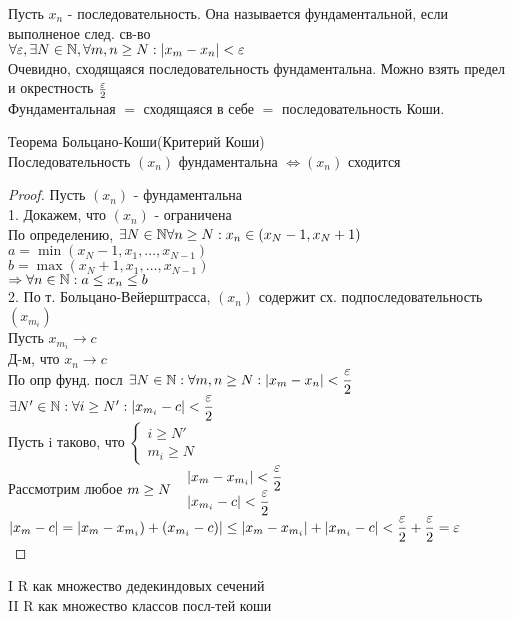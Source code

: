 \begin{definition}
	Пусть $x_n$ - последовательность. Она называется фундаментальной, если выполненое след. св-во \\
	$ \forall \varepsilon,  \exists N \in \mathbb{N}, \forall m,n \geq N : | x_m - x_n | < \varepsilon $\\
	Очевидно, сходящаяся последовательность фундаментальна. Можно взять предел и окрестность $ \frac{\varepsilon}{2} $ \\
	Фундаментальная $=$ сходящаяся в себе $=$ последовательность Коши.
\end{definition}
\begin{theorem}
	Теорема Больцано-Коши(Критерий Коши) \\
	Последовательность $(x_n)$ фундаментальна $ \Leftrightarrow (x_n) $ сходится
	\begin{proof}
		Пусть $ (x_n) $ - фундаментальна \\
		1. Докажем, что $(x_n)$ - ограничена \\
		По определению, $  \exists N \in \mathbb{N} \forall n \geq N : x_n \in (x_{N} - 1, x_N +1)$\\
		$ a = \min(x_N - 1, x_1, \dots, x_{N - 1} )$ \\
		$ b = \max( x_N + 1, x_1, \dots , x_{N - 1}) $ \\
		$ \Rightarrow \forall n \in \mathbb{N} : a \leq x_n \leq b$ \\
		2. По т. Больцано-Вейерштрасса, $ (x_n)$ содержит сх. подпоследовательность $(x_{m_i}) $ \\
		Пусть $ x_{m_i} \rightarrow c $ \\
		Д-м, что $ x_n \rightarrow c $ \\
		По опр фунд. посл $ \exists N \in \mathbb{N}  : \forall m, n \geq N : |x_m-x_n| < \dfrac{\varepsilon}{2}$ \\
		$\exists N' \in \mathbb{N} : \forall i \geq N' : |x_{m_i} -c | < \dfrac{\varepsilon}{2} $ \\
		Пусть i таково, что $ \left\{ \begin{array}{ll}
		i \geq N' \\ m_i \geq N
		\end{array} \right. $ \\
		Рассмотрим любое $ m \geq N \ \ \begin{array}{ll}
			| x_m - x_{m_i} | < \dfrac{\eps}{2} \\
			| x_{m_i} - c | < \dfrac{\eps}{2} 
		\end{array} $ \\
		$ | x_m - c | = | x_m - x_{m_i} ) + (x_{m_i} - c) | \leq |x_m - x_{m_i} | + | x_{m_i} - c | < \dfrac{\varepsilon}{2} + \dfrac{\varepsilon}{2} = \varepsilon $ \\
	\end{proof}
\end{theorem}
I R как множество дедекиндовых сечений\\
II R как множество классов посл-тей коши\\


